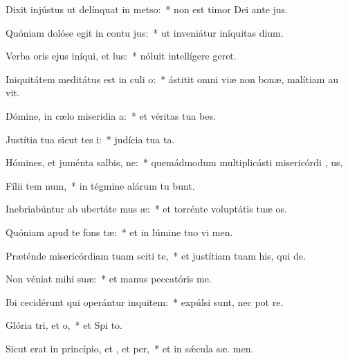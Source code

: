 \item Dixit injústus ut delínquat in metso:~* non est timor Dei ante  jus.
\item Quóniam dolóse egit in contu jus:~* ut inveniátur iníquitas   dium.
\item Verba oris ejus iníqui, et lus:~* nóluit intellígere   geret.
\item Iniquitátem meditátus est in culi o:~* ástitit omni viæ non bonæ, malítiam au  vit.
\item Dómine, in cælo miseridia a:~* et véritas tua   bes.
\item Justítia tua sicut tes i:~* judícia tua  ta.
\item Hómines, et juménta salbis, ne:~* quemádmodum multiplicásti misericórdi , us,
\item Fílii tem num,~* in tégmine alárum tu bunt.
\item Inebriabúntur ab ubertáte mus æ:~* et torrénte voluptátis tuæ  os.
\item Quóniam apud te  fons tæ:~* et in lúmine tuo vi men.
\item Præténde misericórdiam tuam sciti te,~* et justítiam tuam his, qui   de.
\item Non véniat mihi  suæ:~* et manus peccatóris   me.
\item Ibi cecidérunt qui operántur inquitem:~* expúlsi sunt, nec pot re.
\item Glória tri, et o,~* et Spi to.
\item Sicut erat in princípio, et , et per,~* et in sǽcula sæ. men.
